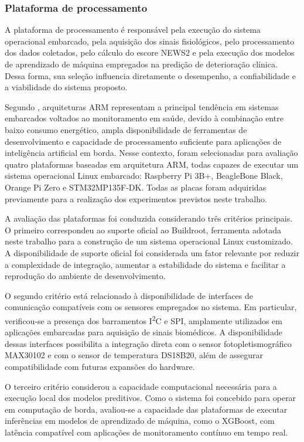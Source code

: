 \subsubsection{Plataforma de processamento}

A plataforma de processamento é responsável pela execução do sistema 
operacional embarcado, pela aquisição dos sinais fisiológicos, pelo 
processamento dos dados coletados, pelo cálculo do escore NEWS2 e pela 
execução dos modelos de aprendizado de máquina empregados na predição de 
deterioração clínica. Dessa forma, sua seleção influencia diretamente o 
desempenho, a confiabilidade e a viabilidade do sistema proposto.

Segundo , arquiteturas ARM representam a principal 
tendência em sistemas embarcados voltados ao monitoramento em saúde, devido 
à combinação entre baixo consumo energético, ampla disponibilidade de 
ferramentas de desenvolvimento e capacidade de processamento suficiente 
para aplicações de inteligência artificial em borda. Nesse contexto, foram 
selecionadas para avaliação quatro plataformas baseadas em arquitetura ARM, 
todas capazes de executar um sistema operacional Linux embarcado: Raspberry 
Pi 3B+, BeagleBone Black, Orange Pi Zero e STM32MP135F-DK. Todas as placas 
foram adquiridas previamente para a realização dos experimentos previstos 
neste trabalho.

A avaliação das plataformas foi conduzida considerando três critérios 
principais. O primeiro correspondeu ao suporte oficial ao Buildroot, 
ferramenta adotada neste trabalho para a construção de um sistema 
operacional Linux customizado. A disponibilidade de suporte oficial foi 
considerada um fator relevante por reduzir a complexidade de integração, 
aumentar a estabilidade do sistema e facilitar a reprodução do ambiente de 
desenvolvimento.

O segundo critério está relacionado à disponibilidade de interfaces de 
comunicação compatíveis com os sensores empregados no sistema. Em 
particular, verificou-se a presença dos barramentos I\textsuperscript{2}C e 
SPI, amplamente utilizados em aplicações embarcadas para aquisição de 
sinais biomédicos. A disponibilidade dessas interfaces possibilita a 
integração direta com o sensor fotopletismográfico MAX30102 e com o sensor 
de temperatura DS18B20, além de assegurar compatibilidade com futuras 
expansões do hardware.

O terceiro critério considerou a capacidade computacional necessária para 
a execução local dos modelos preditivos. Como o sistema foi concebido para 
operar em computação de borda, avaliou-se a capacidade das plataformas de 
executar inferências em modelos de aprendizado de máquina, como o XGBoost, 
com latência compatível com aplicações de monitoramento contínuo em 
tempo real.

